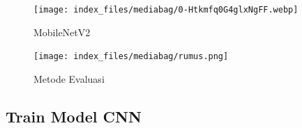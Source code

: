 \documentclass[
  letterpaper,
  DIV=11,
  numbers=noendperiod]{scrreprt}
\begin{document}
\begin{figure}

{\centering \texttt{[image: index\_files/mediabag/0-Htkmfq0G4glxNgFF.webp]}

}

\caption{MobileNetV2}

\end{figure}

\begin{figure}

{\centering \texttt{[image: index\_files/mediabag/rumus.png]}

}

\caption{Metode Evaluasi}

\end{figure}

\hypertarget{train-model-cnn}{%
\subsection*{Train Model CNN}\label{train-model-cnn}}
\end{document}
